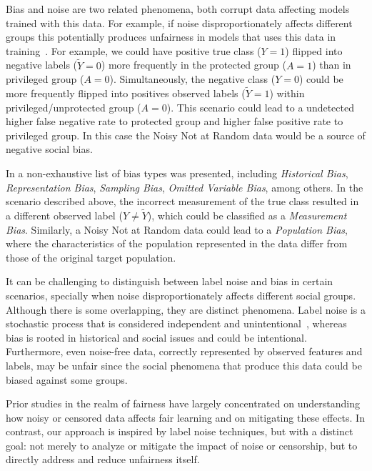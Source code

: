 Bias and noise are two related phenomena, both corrupt data affecting models trained with this data. For example, if noise disproportionately affects different groups this potentially produces unfairness in models that uses this data in training~\citep{Wang2021}. For example, we could have positive true class ($Y = 1$) flipped into negative labels ($\tilde{Y} =0$) more frequently in the protected group ($A = 1$) than in privileged group ($A = 0$). Simultaneously, the negative class ($Y = 0$) could be more frequently flipped into positives observed labels ($\tilde{Y} = 1$) within privileged/unprotected group ($A = 0$). This scenario could lead to a undetected higher false negative rate to protected group and higher false positive rate to privileged group. In this case the Noisy Not at Random data would be a source of negative social bias.

In \cite{Mehrabi2019} a non-exhaustive list of bias types was presented, including \textit{Historical Bias}, \textit{Representation Bias}, \textit{Sampling Bias}, \textit{Omitted Variable Bias}, among others. In the scenario described above, the incorrect measurement of the true class resulted in a different observed label ($Y \neq \tilde{Y}$), which could be classified as a \textit{Measurement Bias}. Similarly, a Noisy Not at Random data could lead to a \textit{Population Bias}, where the characteristics of the population represented in the data differ from those of the original target population.

It can be challenging to distinguish between label noise and bias in certain scenarios, specially when noise disproportionately affects different social groups. Although there is some overlapping, they are distinct phenomena. Label noise is a stochastic process that is considered independent and unintentional~\citep{Frenay2014}, whereas bias is rooted in historical and social issues and could be intentional. Furthermore, even noise-free data, correctly represented by observed features and labels, may be unfair since the social phenomena that produce this data could be biased against some groups. %

Prior studies in the realm of fairness have largely concentrated on understanding how noisy or censored data affects fair learning and on mitigating these effects. In contrast, our approach is inspired by label noise techniques, but with a distinct goal: not merely to analyze or mitigate the impact of noise or censorship, but to directly address and reduce unfairness itself.
